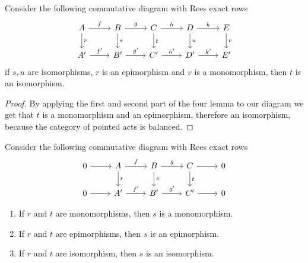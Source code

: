\begin{corollary}
    Consider the following commutative diagram with Rees exact rows
    \[\begin{tikzcd}
            A & B & C & D & E \\
            {A'} & {B'} & {C'} & {D'} & {E'}
            \arrow["f", from=1-1, to=1-2]
            \arrow["r", from=1-1, to=2-1]
            \arrow["g", from=1-2, to=1-3]
            \arrow["s", from=1-2, to=2-2]
            \arrow["h", from=1-3, to=1-4]
            \arrow["t", from=1-3, to=2-3]
            \arrow["k", from=1-4, to=1-5]
            \arrow["u", from=1-4, to=2-4]
            \arrow["v", from=1-5, to=2-5]
            \arrow["{f'}", from=2-1, to=2-2]
            \arrow["{g'}", from=2-2, to=2-3]
            \arrow["{h'}", from=2-3, to=2-4]
            \arrow["{k'}", from=2-4, to=2-5]
    \end{tikzcd}\]
    if $s,u$ are isomorphisms, $r$ is an epimorphism and $v$ is a monomorphism, then $t$ is an isomorphism.
\end{corollary}
\begin{proof}[Proof]
    By applying the first and second part of the four lemma to our diagram we get that $t$ is a monomorphism and an 
    epimorphism, therefore an isomorphism, because the category of pointed acts is balanced.
\end{proof}
\begin{corollary}
    Consider the following commutative diagram with Rees exact rows
    \[\begin{tikzcd}
        0 & A & B & C & 0 \\
        0 & {A'} & {B'} & {C'} & 0
        \arrow[from=1-1, to=1-2]
        \arrow["f", from=1-2, to=1-3]
        \arrow["r", from=1-2, to=2-2]
        \arrow["g", from=1-3, to=1-4]
        \arrow["s", from=1-3, to=2-3]
        \arrow[from=1-4, to=1-5]
        \arrow["t", from=1-4, to=2-4]
        \arrow[from=2-1, to=2-2]
        \arrow["{f'}", from=2-2, to=2-3]
        \arrow["{g'}", from=2-3, to=2-4]
        \arrow[from=2-4, to=2-5]
    \end{tikzcd}\]
    \begin{enumerate}
        \item If $r$ and $t$ are monomorphisms, then $s$ is a monomorphism.
        \item If $r$ and $t$ are epimorphisms, then $s$ is an epimorphism.
        \item If $r$ and $t$ are isomorphism, then $s$ is an isomorphism. 
    \end{enumerate}
\end{corollary}
